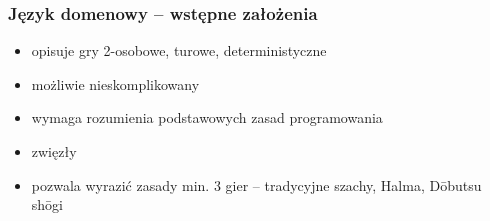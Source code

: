 \documentclass{beamer}
\begin{document}
\begin{frame}
	\frametitle{Język domenowy -- wstępne założenia}
	\begin{itemize}
		\item opisuje gry 2-osobowe, turowe, deterministyczne
		\item możliwie nieskomplikowany
		\item wymaga rozumienia podstawowych zasad programowania
		\item zwięzły
		\item pozwala wyrazić zasady min. 3 gier -- tradycyjne szachy, Halma, Dōbutsu shōgi
	\end{itemize}
\end{frame}


\end{document}
